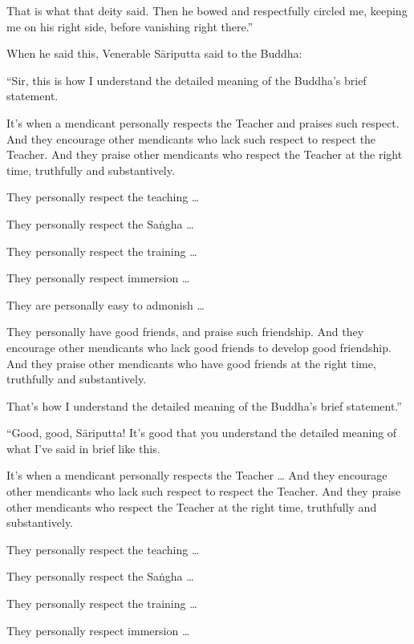 \documentclass[12pt,openany]{book}%
\begin{document}
That is what that deity said. Then he bowed and respectfully circled me, keeping me on his right side, before vanishing right there.” 

When he said this, Venerable \textsanskrit{Sāriputta} said to the Buddha: 

“Sir, this is how I understand the detailed meaning of the Buddha’s brief statement. 

It’s when a mendicant personally respects the Teacher and praises such respect. And they encourage other mendicants who lack such respect to respect the Teacher. And they praise other mendicants who respect the Teacher at the right time, truthfully and substantively. 

They personally respect the teaching … 

They personally respect the \textsanskrit{Saṅgha} … 

They personally respect the training … 

They personally respect immersion … 

They are personally easy to admonish … 

They personally have good friends, and praise such friendship. And they encourage other mendicants who lack good friends to develop good friendship. And they praise other mendicants who have good friends at the right time, truthfully and substantively. 

That’s how I understand the detailed meaning of the Buddha’s brief statement.” 

“Good, good, \textsanskrit{Sāriputta}! It’s good that you understand the detailed meaning of what I’ve said in brief like this. 

It’s when a mendicant personally respects the Teacher … And they encourage other mendicants who lack such respect to respect the Teacher. And they praise other mendicants who respect the Teacher at the right time, truthfully and substantively. 

They personally respect the teaching … 

They personally respect the \textsanskrit{Saṅgha} … 

They personally respect the training … 

They personally respect immersion … 
\end{document}
